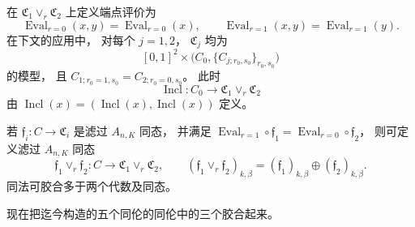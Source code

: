 在 $\mathfrak C_1\vee_r\mathfrak C_2$
上定义端点评价为
\[
\operatorname{Eval}_{r=0}(x,y)
=\operatorname{Eval}_{r=0}(x),\qquad
\operatorname{Eval}_{r=1}(x,y)
=\operatorname{Eval}_{r=1}(y).
\]
在下文的应用中，
对每个 $j=1,2$，
$\mathfrak C_j$
均为
\[
[0,1]^2\times
\bigl(C_0,\{C_{j;r_0,s_0}\}_{r_0,s_0}\bigr)
\]
的模型，
且
$C_{1;r_0=1,s_0}
=C_{2;r_0=0,s_0}$。
此时
\[
\operatorname{Incl}\colon
C_0\longrightarrow\mathfrak C_1\vee_r\mathfrak C_2
\]
由
$\operatorname{Incl}(x)
=(\operatorname{Incl}(x),\operatorname{Incl}(x))$
定义。

若
$\mathfrak f_i\colon C\to\mathfrak C_i$
是滤过 $A_{n,K}$ 同态，
并满足
$\operatorname{Eval}_{r=1}\circ\mathfrak f_1
=\operatorname{Eval}_{r=0}\circ\mathfrak f_2$，
则可定义滤过 $A_{n,K}$ 同态
\[
\mathfrak f_1\vee_r\mathfrak f_2\colon
C\longrightarrow
\mathfrak C_1\vee_r\mathfrak C_2,
\qquad
(\mathfrak f_1\vee_r\mathfrak f_2)_{k,\beta}
=(\mathfrak f_1)_{k,\beta}
\oplus(\mathfrak f_2)_{k,\beta}.
\]
同法可胶合多于两个代数及同态。

现在把迄今构造的五个同伦的同伦中的三个胶合起来。
